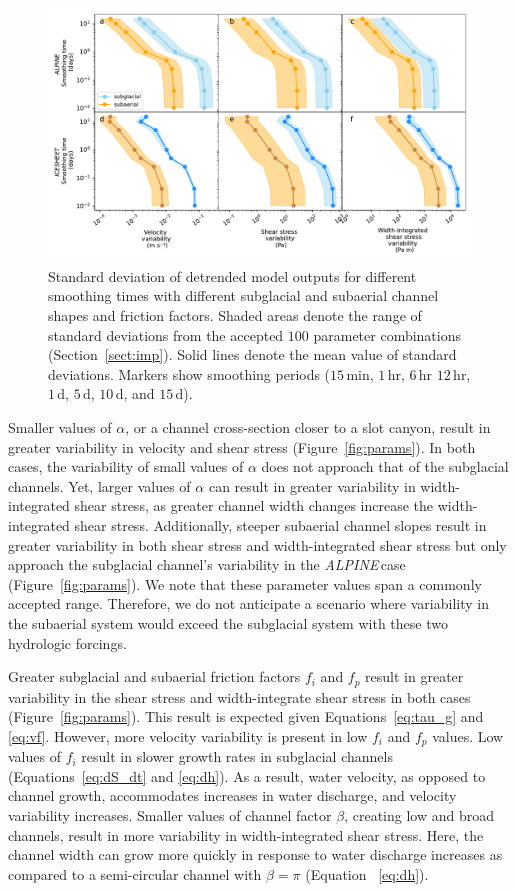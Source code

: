 \documentclass[esurf, manuscript]{copernicus}
\newcommand{\alpine}{\textit{ALPINE}\,}
\begin{document}
\begin{figure}[hbt!]
  \centering
  \includegraphics[width=0.9\linewidth]{Fig3.pdf}
  \caption{Standard deviation of detrended model outputs for different smoothing times with different subglacial and subaerial channel shapes and friction factors.
    Shaded areas denote the range of standard deviations from the accepted $100$ parameter combinations (Section~\ref{sect:imp}).
    Solid lines denote the mean value of standard deviations.
    Markers show smoothing periods ($15$\,\unit{min}, $1$\,\unit{hr}, $6$\,\unit{hr} $12$\,\unit{hr}, $1$\,\unit{d}, $5$\,\unit{d}, $10$\,\unit{d}, and $15$\,\unit{d}).
  }
  \label{fig:multi_run}
\end{figure}

Smaller values of $\alpha$, or a channel cross-section closer to a slot canyon, result in greater variability in velocity and shear stress (Figure~\ref{fig:params}).
In both cases, the variability of small values of $\alpha$ does not approach that of the subglacial channels.
Yet, larger values of $\alpha$ can result in greater variability in width-integrated shear stress, as greater channel width changes increase the width-integrated shear stress.
Additionally, steeper subaerial channel slopes result in greater variability in both shear stress and width-integrated shear stress but only approach the subglacial channel's variability in the \alpine case (Figure~\ref{fig:params}). 
We note that these parameter values span a commonly accepted range.
Therefore, we do not anticipate a scenario where variability in the subaerial system would exceed the subglacial system with these two hydrologic forcings.

Greater subglacial and subaerial friction factors $f_i$ and $f_p$ result in greater variability in the shear stress and width-integrate shear stress in both cases (Figure~\ref{fig:params}).
This result is expected given Equations~\ref{eq:tau_g} and \ref{eq:vf}.
However, more velocity variability is present in low  $f_i$ and $f_p$ values. 
Low values of $f_i$ result in slower growth rates in subglacial channels (Equations~\ref{eq:dS_dt} and \ref{eq:dh}).
As a result, water velocity, as opposed to channel growth, accommodates increases in water discharge, and velocity variability increases.
Smaller values of channel factor $\beta$, creating low and broad channels, result in more variability in width-integrated shear stress.
Here, the channel width can grow more quickly in response to water discharge increases as compared to a semi-circular channel with $\beta = \pi$ (Equation~ \ref{eq:dh}).
\end{document}
